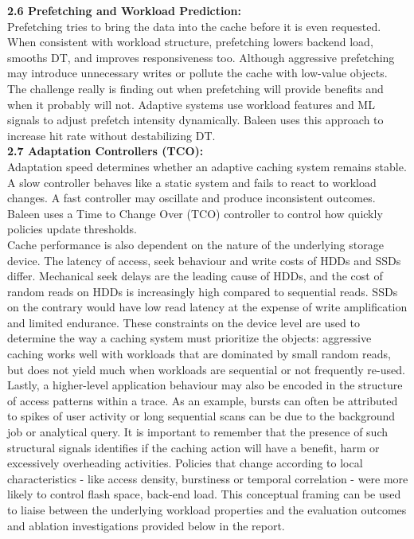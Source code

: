 \documentclass[sigconf]{acmart}
\begin{document}
{\noindent\textbf{2.6 Prefetching and Workload Prediction:}\\\indent Prefetching tries to bring the data into the cache before it is even requested. When consistent with workload structure, prefetching lowers backend load, smooths DT, and improves responsiveness too. Although aggressive prefetching may introduce unnecessary writes or pollute the cache with low-value objects. The challenge really is finding out when prefetching will provide benefits and when it probably will not. Adaptive systems use workload features and ML signals to adjust prefetch intensity dynamically. Baleen uses this approach to increase hit rate without destabilizing DT.\\

\noindent\textbf{2.7 Adaptation Controllers (TCO):}\\\indent Adaptation speed determines whether an adaptive caching system remains stable. A slow controller behaves like a static system and fails to react to workload changes. A fast controller may oscillate and produce inconsistent outcomes. Baleen uses a Time to Change Over (TCO) controller to control how quickly policies update thresholds.\\

Cache performance is also dependent on the nature of the underlying storage device. The latency of access, seek behaviour and write costs of HDDs and SSDs differ. Mechanical seek delays are the leading cause of HDDs, and the cost of random reads on HDDs is increasingly high compared to sequential reads. SSDs on the contrary would have low read latency at the expense of write amplification and limited endurance. These constraints on the device level are used to determine the way a caching system must prioritize the objects: aggressive caching works well with workloads that are dominated by small random reads, but does not yield much when workloads are sequential or not frequently re-used.\\\indent Lastly, a higher-level application behaviour may also be encoded in the structure of access patterns within a trace. As an example, bursts can often be attributed to spikes of user activity or long sequential scans can be due to the background job or analytical query. It is important to remember that the presence of such structural signals identifies if the caching action will have a benefit, harm or excessively overheading activities. Policies that change according to local characteristics - like access density, burstiness or temporal correlation - were more likely to control flash space, back-end load. This conceptual framing can be used to liaise between the underlying workload properties and the evaluation outcomes and ablation investigations provided below in the report.

}
\end{document}
